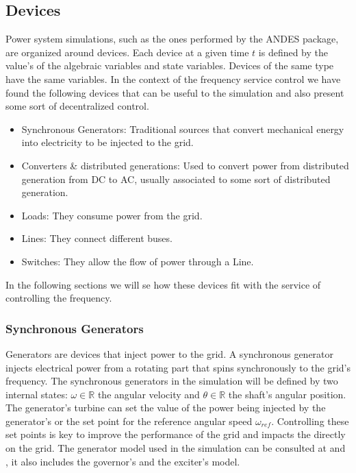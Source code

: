 \documentclass{article}
\begin{document}
\subsection{Devices}

Power system simulations, such as the ones performed by the ANDES package, are organized around devices. Each device at a given time $t$ is defined by the value's of the algebraic variables and state variables. Devices of the same type have the same variables. In the context of the frequency service control we have found the following devices that can be useful to the simulation and also present some sort of decentralized control.

\begin{itemize}
    \item Synchronous Generators: Traditional sources that convert mechanical energy into electricity to be injected to the grid.
    \item Converters \& distributed generations: Used to convert power from distributed generation from DC to AC, usually associated to some sort of distributed generation.
    \item Loads: They consume power from the grid.
    \item Lines: They connect different buses.
    \item Switches: They allow the flow of power through a Line.
\end{itemize}

In the following sections we will se how these devices fit with the service of controlling the frequency.

\subsubsection*{Synchronous Generators}

Generators are devices that inject power to the grid. A synchronous generator injects electrical power from a rotating part that spins synchronously to the grid's frequency. The synchronous generators in the simulation will be defined by two internal states: $\omega \in \mathbb{R}$ the angular velocity and $\theta  \in \mathbb{R}$ the shaft's angular position. The generator's turbine can set the value of the power being injected by the generator's or the set point for the reference angular speed $\omega_{ref}$. Controlling these set points is key to improve the performance of the grid and impacts the directly on the grid. The generator model used in the simulation can be consulted at \cite{image:diagram:governor} and \cite{source:andes:models:generator}, it also includes the governor's and the exciter's model.
\end{document}
